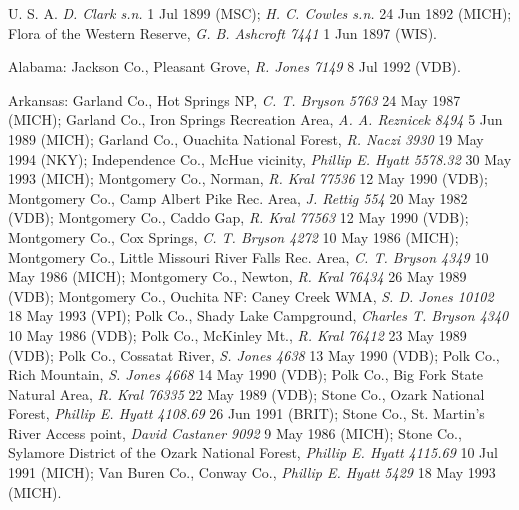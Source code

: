 \documentclass{article}
\begin{document}
U. S. A.
\textit{D. Clark s.n.} 1 Jul 1899 (MSC);
\textit{H. C. Cowles s.n.} 24 Jun 1892 (MICH);
Flora of the Western Reserve, \textit{G. B. Ashcroft 7441} 1 Jun 1897 (WIS).

Alabama:
Jackson Co., Pleasant Grove, \textit{R. Jones 7149} 8 Jul 1992 (VDB).

Arkansas:
Garland Co., Hot Springs NP, \textit{C. T. Bryson 5763} 24 May 1987 (MICH);
Garland Co., Iron Springs Recreation Area, \textit{A. A. Reznicek 8494} 5 Jun 1989 (MICH);
Garland Co., Ouachita National Forest, \textit{R. Naczi 3930} 19 May 1994 (NKY);
Independence Co., McHue vicinity, \textit{Phillip E. Hyatt 5578.32} 30 May 1993 (MICH);
Montgomery Co., Norman, \textit{R. Kral 77536} 12 May 1990 (VDB);
Montgomery Co., Camp Albert Pike Rec. Area, \textit{J. Rettig 554} 20 May 1982 (VDB);
Montgomery Co., Caddo Gap, \textit{R. Kral 77563} 12 May 1990 (VDB);
Montgomery Co., Cox Springs, \textit{C. T. Bryson 4272} 10 May 1986 (MICH);
Montgomery Co., Little Missouri River Falls Rec. Area, \textit{C. T. Bryson 4349} 10 May 1986 (MICH);
Montgomery Co., Newton, \textit{R. Kral 76434} 26 May 1989 (VDB);
Montgomery Co., Ouchita NF: Caney Creek WMA, \textit{S. D. Jones 10102} 18 May 1993 (VPI);
Polk Co., Shady Lake Campground, \textit{Charles T. Bryson 4340} 10 May 1986 (VDB);
Polk Co., McKinley Mt., \textit{R. Kral 76412} 23 May 1989 (VDB);
Polk Co.,  Cossatat River, \textit{S. Jones 4638} 13 May 1990 (VDB);
Polk Co., Rich Mountain, \textit{S. Jones 4668} 14 May 1990 (VDB);
Polk Co., Big Fork State Natural Area, \textit{R. Kral 76335} 22 May 1989 (VDB);
Stone Co., Ozark National Forest, \textit{Phillip E. Hyatt 4108.69} 26 Jun 1991 (BRIT);
Stone Co., St. Martin's River Access point, \textit{David Castaner 9092} 9 May 1986 (MICH);
Stone Co., Sylamore District of the Ozark National Forest, \textit{Phillip E. Hyatt 4115.69} 10 Jul 1991 (MICH);
Van Buren Co., Conway Co., \textit{Phillip E. Hyatt 5429} 18 May 1993 (MICH).
\end{document}
